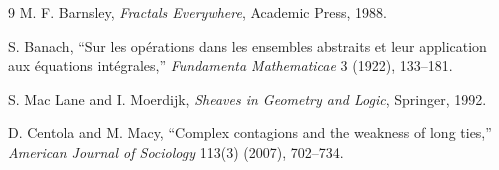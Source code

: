\documentclass[11pt]{article}
\theoremstyle{plain}
\begin{document}
\begin{thebibliography}{9}
M. F. Barnsley, \emph{Fractals Everywhere}, Academic Press, 1988.

S. Banach, ``Sur les opérations dans les ensembles abstraits et leur application
aux équations intégrales,'' \emph{Fundamenta Mathematicae} 3 (1922), 133--181.

S. Mac Lane and I. Moerdijk, \emph{Sheaves in Geometry and Logic}, Springer,
1992.

D. Centola and M. Macy, ``Complex contagions and the weakness of long ties,''
\emph{American Journal of Sociology} 113(3) (2007), 702--734.
\end{thebibliography}
\end{document}
